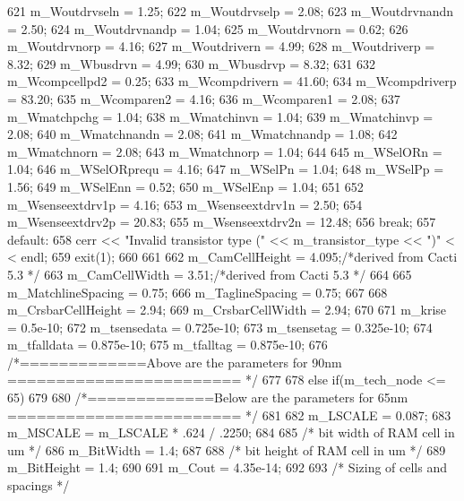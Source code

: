 \begin{DoxyCode}
{{{621                 m_Woutdrvseln = 1.25;
622                 m_Woutdrvselp = 2.08;
623                 m_Woutdrvnandn = 2.50;
624                 m_Woutdrvnandp = 1.04;
625                 m_Woutdrvnorn = 0.62;
626                 m_Woutdrvnorp = 4.16;
627                 m_Woutdrivern = 4.99;
628                 m_Woutdriverp = 8.32;
629                 m_Wbusdrvn = 4.99;
630                 m_Wbusdrvp = 8.32;
631 
632                 m_Wcompcellpd2 = 0.25;
633                 m_Wcompdrivern = 41.60;
634                 m_Wcompdriverp = 83.20;
635                 m_Wcomparen2 = 4.16;
636                 m_Wcomparen1 = 2.08;
637                 m_Wmatchpchg = 1.04;
638                 m_Wmatchinvn = 1.04;
639                 m_Wmatchinvp = 2.08;
640                 m_Wmatchnandn = 2.08;
641                 m_Wmatchnandp = 1.08;
642                 m_Wmatchnorn = 2.08;
643                 m_Wmatchnorp = 1.04;
644 
645                 m_WSelORn = 1.04;
646                 m_WSelORprequ = 4.16;
647                 m_WSelPn = 1.04;
648                 m_WSelPp = 1.56;
649                 m_WSelEnn = 0.52;
650                 m_WSelEnp = 1.04;
651 
652                 m_Wsenseextdrv1p = 4.16;
653                 m_Wsenseextdrv1n = 2.50;
654                 m_Wsenseextdrv2p = 20.83;
655                 m_Wsenseextdrv2n = 12.48;
656                 break;
657             default:
658                 cerr << "Invalid transistor type (" << m_transistor_type << ")" <
      < endl;
659                 exit(1);
660         }
661 
662         m_CamCellHeight = 4.095;/*derived from Cacti 5.3 */ 
663         m_CamCellWidth = 3.51;/*derived from Cacti 5.3 */ 
664 
665         m_MatchlineSpacing = 0.75;
666         m_TaglineSpacing = 0.75;
667 
668         m_CrsbarCellHeight = 2.94;
669         m_CrsbarCellWidth = 2.94;
670 
671         m_krise = 0.5e-10;
672         m_tsensedata = 0.725e-10;
673         m_tsensetag = 0.325e-10;
674         m_tfalldata = 0.875e-10;
675         m_tfalltag = 0.875e-10;
676         /*=============Above are the parameters for 90nm ========================
      */
677     }
678     else if(m_tech_node <= 65)
679     {
680         /*=============Below are the parameters for 65nm ========================
      */
681 
682         m_LSCALE = 0.087;
683         m_MSCALE = m_LSCALE * .624 / .2250;
684 
685         /* bit width of RAM cell in um */
686         m_BitWidth = 1.4;
687 
688         /* bit height of RAM cell in um */
689         m_BitHeight = 1.4;
690 
691         m_Cout = 4.35e-14;
692 
693         /* Sizing of cells and spacings */
}}
\end{DoxyCode}
